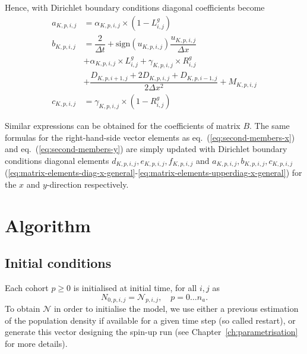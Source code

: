 Hence, with Dirichlet boundary conditions diagonal coefficients become
\begin{align}
   \label{eq:matrix-elements-lowerdiag-x-general}
   a_{K,p,i,j} &= \alpha_{K,p,i,j}\times(1-L^g_{i,j})
   \\
   \label{eq:matrix-elements-diag-x-general}
   b_{K,p,i,j} &=
   \dfrac{2}{\Delta t}+\mbox{sign}(u_{K,p,i,j})\dfrac{u_{K,p,i,j}}{\Delta x}\\\nonumber
   &+\alpha_{K,p,i,j}\times L^g_{i,j} + \gamma_{K,p,i,j}\times R^g_{i,j}\\\nonumber
   &+\dfrac{D_{K,p,i+1,j}+2D_{K,p,i,j}+D_{K,p,i-1,j}}{2\Delta x^2}+M_{K,p,i,j}
   \\
   \label{eq:matrix-elements-upperdiag-x-general}
   c_{K,p,i,j} &= \gamma_{K,p,i,j}\times(1-R^g_{i,j})
 \end{align}

Similar expressions can be obtained for the coefficients of matrix $B$. The same formulas for the right-hand-side vector elements as eq.~(\ref{eq:second-members-x}) and eq.~(\ref{eq:second-members-y}) are simply updated with Dirichlet boundary conditions diagonal elements $d_{K,p,i,j}, e_{K,p,i,j}, f_{K,p,i,j}$ and $a_{K,p,i,j}, b_{K,p,i,j}, c_{K,p,i,j}$ (\ref{eq:matrix-elements-diag-x-general}-\ref{eq:matrix-elements-upperdiag-x-general}) for the $x$ and $y$-direction respectively. 



\section{Algorithm}
\label{sec:algorithm}

\subsection{Initial conditions}

Each cohort $p\geq0$ is initialised at initial  time, for all $i,j$ as
\begin{equation}
  \label{eq:2steps-init-cohort}
  N_{0,p,i,j} = \mathcal{N}_{p,i,j}, \quad p=0\dots n_a.
\end{equation}
To obtain $\mathcal{N}$ in order to initialise the model, we use either a previous estimation of the population density if available for a given time step (so called restart), or generate this vector designing the spin-up run (see Chapter~\ref{ch:parametrisation} for more details).

